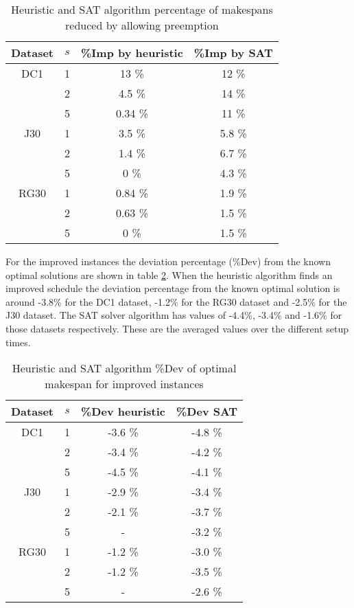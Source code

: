 \begin{table}
	\begin{center}
		\caption{Heuristic and SAT algorithm percentage of makespans reduced by allowing preemption}
		\label{table:table2}
		\begin{tabular}{ c | c c c }
			Dataset & \(s\) & \%Imp by heuristic & \%Imp by SAT \\
			\hline
			DC1  & 1 & 13 \% & 12 \% \\ 
			  & 2 & 4.5 \% & 14 \% \\  
			  & 5 & 0.34 \% & 11 \% \\ 
			J30  & 1 & 3.5 \% & 5.8 \% \\ 
			  & 2 & 1.4 \% & 6.7 \% \\  
			  & 5 & 0 \% & 4.3 \% \\ 
			RG30 & 1 & 0.84 \% & 1.9 \% \\ 
			 & 2 & 0.63 \% & 1.5 \% \\  
			 & 5 & 0 \% & 1.5 \%
		\end{tabular}
	\end{center}
\end{table}

For the improved instances the deviation percentage (\%Dev) from the known optimal solutions are shown in table \ref{table:table3}. When the heuristic algorithm finds an improved schedule the deviation percentage from the known optimal solution is around -3.8\% for the DC1 dataset, -1.2\% for the RG30 dataset and -2.5\% for the J30 dataset. The SAT solver algorithm has values of -4.4\%, -3.4\% and -1.6\% for those datasets respectively. These are the averaged values over the different setup times.

\begin{table}
	\begin{center}
		\caption{Heuristic and SAT algorithm \%Dev of optimal makespan for improved instances}
		\label{table:table3}
		\begin{tabular}{ c | c c c }
			Dataset & \(s\) & \%Dev heuristic & \%Dev SAT \\
			\hline
			DC1  & 1 & -3.6 \% & -4.8 \% \\ 
			  & 2 & -3.4 \% & -4.2 \% \\  
			  & 5 & -4.5 \% & -4.1 \% \\ 
			J30  & 1 & -2.9 \% & -3.4 \% \\ 
			  & 2 & -2.1 \% & -3.7 \% \\  
			  & 5 & - & -3.2 \% \\ 
			RG30 & 1 & -1.2 \% & -3.0 \% \\ 
			 & 2 & -1.2 \% & -3.5 \% \\  
			 & 5 & - & -2.6 \%
		\end{tabular}
	\end{center}
\end{table}

